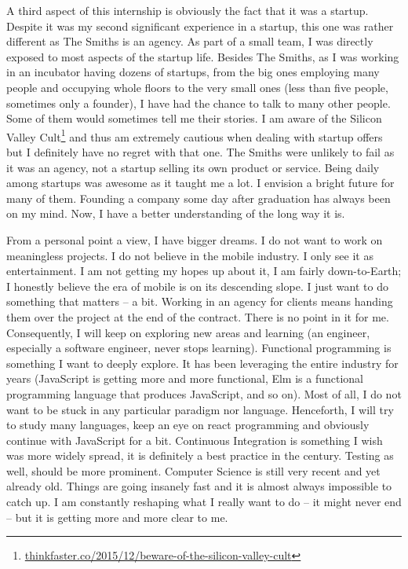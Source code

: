 A third aspect of this internship is obviously the fact that it was a startup. Despite it was my second significant experience in a startup, this one was rather different as The Smiths is an agency. As part of a small team, I was directly exposed to most aspects of the startup life. Besides The Smiths, as I was working in an incubator having dozens of startups, from the big ones employing many people and occupying whole floors to the very small ones (less than five people, sometimes only a founder), I have had the chance to talk to many other people. Some of them would sometimes tell me their stories. I am aware of the Silicon Valley Cult\footnote{\href{https://thinkfaster.co/2015/12/beware-of-the-silicon-valley-cult/}{thinkfaster.co/2015/12/beware-of-the-silicon-valley-cult}} and thus am extremely cautious when dealing with startup offers but I definitely have no regret with that one. The Smiths were unlikely to fail as it was an agency, not a startup selling its own product or service. Being daily among startups was awesome as it taught me a lot. I envision a bright future for many of them. Founding a company some day after graduation has always been on my mind. Now, I have a better understanding of the long way it is.

\bigskip

From a personal point a view, I have bigger dreams. I do not want to work on meaningless projects. I do not believe in the mobile industry. I only see it as entertainment. I am not getting my hopes up about it, I am fairly down-to-Earth; I honestly believe the era of mobile is on its descending slope. I just want to do something that matters -- a bit. Working in an agency for clients means handing them over the project at the end of the contract. There is no point in it for me.\\
Consequently, I will keep on exploring new areas and learning (an engineer, especially a software engineer, never stops learning). Functional programming is something I want to deeply explore. It has been leveraging the entire industry for years (JavaScript is getting more and more functional, Elm is a functional programming language that produces JavaScript, and so on). Most of all, I do not want to be stuck in any particular paradigm nor language. Henceforth, I will try to study many languages, keep an eye on react programming and obviously continue with JavaScript for a bit. Continuous Integration is something I wish was more widely spread, it is definitely a best practice in the  century. Testing as well, should be more prominent. Computer Science is still very recent and yet already old. Things are going insanely fast and it is almost always impossible to catch up. I am constantly reshaping what I really want to do -- it might never end -- but it is getting more and more clear to me.